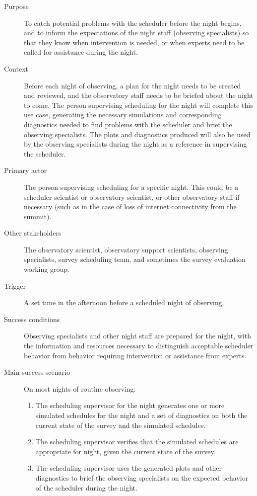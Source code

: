\begin{description}
\item[{Purpose}] To catch potential problems with the scheduler before the night begins, and to inform the expectations of the night staff (observing specialists) so that they know when intervention is needed, or when experts need to be called for assistance during the night.
\item[{Context}] Before each night of observing, a plan for the night needs to be created and reviewed, and the observatory staff needs to be briefed about the night to come. The person supervising scheduling for the night will complete this use case, generating the necessary simulations and corresponding diagnostics needed to find problems with the scheduler and brief the observing specialists. The plots and diagnostics produced will also be used by the observing specialists during the night as a reference in supervising the scheduler.
\item[{Primary actor}]  The person supervising scheduling for a specific night. This could be a scheduler scientist or observatory scientist, or other observatory staff if necessary (such as in the case of loss of internet connectivity from the summit).
\item[{Other stakeholders}] The observatory scientist, observatory support scientists, observing specialists, survey scheduling team, and sometimes the survey evaluation working group.
\item[{Trigger}] A set time in the afternoon before a scheduled night of observing.
\item[{Success conditions}] Observing specialists and other night staff are prepared for the night, with the information and resources necessary to distinguish acceptable scheduler behavior from behavior requiring intervention or assistance from experts.
\item[{Main success scenario}] On most nights of routine observing:
\begin{enumerate}
\item The scheduling supervisor for the night generates one or more simulated schedules for the night and a set of diagnostics on both the current state of the survey and the simulated schedules.
\item The scheduling supervisor verifies that the simulated schedules are appropriate for night, given the current state of the survey.
\item The scheduling supervisor uses the generated plots and other diagnostics to brief the observing specialists on the expected behavior of the scheduler during the night.

\end{enumerate}
\end{description}
